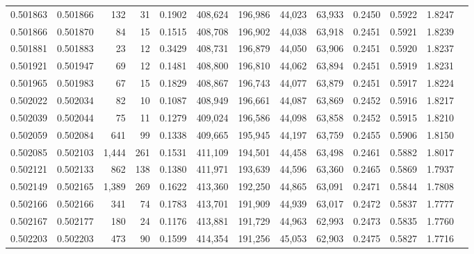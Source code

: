 \begin{tabular}{rrrrrrrrrrrrr}
0.501863 & 0.501866 &   132 &    31 &                                     0.1902 & 408,624 & 196,986 &  44,023 &  63,933 & 0.2450 & 0.5922 & 1.8247 \\
0.501866 & 0.501870 &    84 &    15 &                                     0.1515 & 408,708 & 196,902 &  44,038 &  63,918 & 0.2451 & 0.5921 & 1.8239 \\
0.501881 & 0.501883 &    23 &    12 &                                     0.3429 & 408,731 & 196,879 &  44,050 &  63,906 & 0.2451 & 0.5920 & 1.8237 \\
0.501921 & 0.501947 &    69 &    12 &                                     0.1481 & 408,800 & 196,810 &  44,062 &  63,894 & 0.2451 & 0.5919 & 1.8231 \\
0.501965 & 0.501983 &    67 &    15 &                                     0.1829 & 408,867 & 196,743 &  44,077 &  63,879 & 0.2451 & 0.5917 & 1.8224 \\
0.502022 & 0.502034 &    82 &    10 &                                     0.1087 & 408,949 & 196,661 &  44,087 &  63,869 & 0.2452 & 0.5916 & 1.8217 \\
0.502039 & 0.502044 &    75 &    11 &                                     0.1279 & 409,024 & 196,586 &  44,098 &  63,858 & 0.2452 & 0.5915 & 1.8210 \\
0.502059 & 0.502084 &   641 &    99 &                                     0.1338 & 409,665 & 195,945 &  44,197 &  63,759 & 0.2455 & 0.5906 & 1.8150 \\
0.502085 & 0.502103 & 1,444 &   261 &                                     0.1531 & 411,109 & 194,501 &  44,458 &  63,498 & 0.2461 & 0.5882 & 1.8017 \\
0.502121 & 0.502133 &   862 &   138 &                                     0.1380 & 411,971 & 193,639 &  44,596 &  63,360 & 0.2465 & 0.5869 & 1.7937 \\
0.502149 & 0.502165 & 1,389 &   269 &                                     0.1622 & 413,360 & 192,250 &  44,865 &  63,091 & 0.2471 & 0.5844 & 1.7808 \\
0.502166 & 0.502166 &   341 &    74 &                                     0.1783 & 413,701 & 191,909 &  44,939 &  63,017 & 0.2472 & 0.5837 & 1.7777 \\
0.502167 & 0.502177 &   180 &    24 &                                     0.1176 & 413,881 & 191,729 &  44,963 &  62,993 & 0.2473 & 0.5835 & 1.7760 \\
0.502203 & 0.502203 &   473 &    90 &                                     0.1599 & 414,354 & 191,256 &  45,053 &  62,903 & 0.2475 & 0.5827 & 1.7716 \\

\end{tabular}
